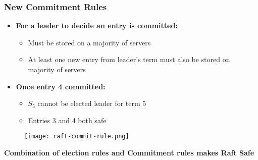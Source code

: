 \begin{frame}
    \frametitle{New Commitment Rules}
    \begin{minipage}{.55\textwidth}
        \begin{itemize}
            \item \textbf{For a leader to decide an entry is committed:}
                \begin{itemize}
                    \item Must be stored on a majority of servers
                    \item At least one new entry from leader's term must also be stored on majority of servers
                \end{itemize}
            \item \textbf{Once entry 4 committed:}
                \begin{itemize}
                    \item $S_5$ cannot be elected leader for term 5
                    \item Entries 3 and 4 both safe
                \end{itemize}
        \end{itemize}
    \end{minipage}
    \begin{minipage}{.4\textwidth}
        \begin{figure}[hp]
            \texttt{[image: raft-commit-rule.png]}
        \end{figure}
    \end{minipage}
    \centering
    \textbf{Combination of election rules and Commitment rules makes Raft Safe}
\end{frame}

